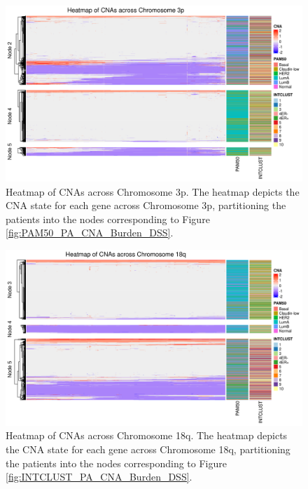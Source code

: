 \begin{figure}[H]
\vspace{0.7cm}
  \centering
  \includegraphics[width=1\textwidth]{../figures/Chapter_3/PA_Ctree_Survival_Burden_DSS_PAM50.png_3p_All_Heatmap.png}
  \caption[Heatmap of CNAs across Chromosome 3p]{Heatmap of CNAs across Chromosome 3p. The heatmap depicts the CNA state for each gene across Chromosome 3p, partitioning the patients into the nodes corresponding to Figure \ref{fig:PAM50_PA_CNA_Burden_DSS}.}
  \label{PA_SurvTrees_Burden_Heatmaps_3p}
\end{figure}
\vspace{1cm}
\begin{figure}[H]
  \centering
  \includegraphics[width=1\textwidth]{../figures/Chapter_3/PA_PartyKit_Survival_Burden_DSS_INTCLUST.png_18q_All_Heatmap.png}
  \caption[Heatmap of CNAs across Chromosome 18q]{Heatmap of CNAs across Chromosome 18q. The heatmap depicts the CNA state for each gene across Chromosome 18q, partitioning the patients into the nodes corresponding to Figure \ref{fig:INTCLUST_PA_CNA_Burden_DSS}.}
  \label{PA_SurvTrees_Burden_Heatmaps_18q}
\end{figure} 

